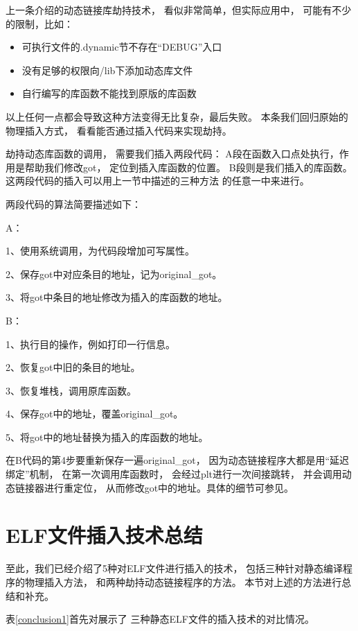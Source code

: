 上一条介绍的动态链接库劫持技术，
看似非常简单，但实际应用中，
可能有不少的限制，比如：

\begin{itemize}
  \item 可执行文件的.dynamic节不存在“DEBUG”入口
  \item 没有足够的权限向/lib下添加动态库文件
  \item 自行编写的库函数不能找到原版的库函数 
\end{itemize}

以上任何一点都会导致这种方法变得无比复杂，最后失败。
本条我们回归原始的物理插入方式，
看看能否通过插入代码来实现劫持。

劫持动态库函数的调用，
需要我们插入两段代码：
A段在函数入口点处执行，作用是帮助我们修改got，
定位到插入库函数的位置。
B段则是我们插入的库函数。
这两段代码的插入可以用上一节中描述的三种方法
的任意一中来进行。

两段代码的算法简要描述如下：

A：

1、使用系统调用，为代码段增加可写属性。

2、保存got中对应条目的地址，记为original\_got。

3、将got中条目的地址修改为插入的库函数的地址。

B：

1、执行目的操作，例如打印一行信息。

2、恢复got中旧的条目的地址。

3、恢复堆栈，调用原库函数。

4、保存got中的地址，覆盖original\_got。

5、将got中的地址替换为插入的库函数的地址。

在B代码的第4步要重新保存一遍original\_got，
因为动态链接程序大都是用“延迟绑定”机制，
在第一次调用库函数时，
会经过plt进行一次间接跳转，
并会调用动态链接器进行重定位，
从而修改got中的地址。具体的细节可参见\cite{elf1.2}。


\section{ELF文件插入技术总结}

至此，我们已经介绍了5种对ELF文件进行插入的技术，
包括三种针对静态编译程序的物理插入方法，
和两种劫持动态链接程序的方法。
本节对上述的方法进行总结和补充。

表\ref{conclusion1}首先对展示了
三种静态ELF文件的插入技术的对比情况。

